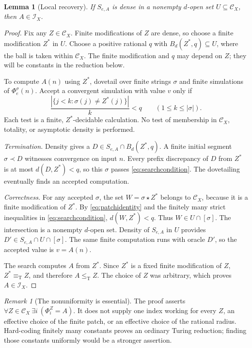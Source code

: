 \documentclass[11pt,a4paper]{article}
\newcommand{\leT}{\leq_{\mathrm T}}
\newcommand{\eqT}{\equiv_{\mathrm T}}
\newcommand{\CD}{\mathcal C}
\newcommand{\core}{\mathcal I}
\newcommand{\patch}{\mathbin\star}
\newtheorem{lemma}[theorem]{Lemma}
\theoremstyle{definition}\newtheorem{definition}[theorem]{Definition}
\theoremstyle{remark}\newtheorem{remark}[theorem]{Remark}
\begin{document}
\begin{lemma}[Local recovery]\label{lem:recovery}
If $S_{e,A}$ is dense in a nonempty $d$-open set $U\subseteq\CD_X$, then
$A\in\core_X$.
\end{lemma}
\begin{proof}
Fix any $Z\in\CD_X$. Finite modifications of $Z$ are dense, so choose a finite
modification $Z^*$ in $U$. Choose a positive rational $q$ with
$B_d(Z^*,q)\subseteq U$, where the ball is taken within $\CD_X$. The finite
modification and $q$ may depend on $Z$; they will be constants in the
reduction below.

To compute $A(n)$ using $Z^*$, dovetail over finite strings $\sigma$ and
finite simulations of $\Phi_e^\sigma(n)$. Accept a convergent simulation
with value $v$ only if
\begin{equation}\label{eq:searchcondition}
 \frac{|\{j<k:\sigma(j)\ne Z^*(j)\}|}{k}<q
 \qquad(1\le k\le|\sigma|).
\end{equation}
Each test is a finite, $Z^*$-decidable calculation. No test of membership in
$\CD_X$, totality, or asymptotic density is performed.

\emph{Termination.} Density gives a $D\in S_{e,A}\cap B_d(Z^*,q)$. A finite
initial segment $\sigma\prec D$ witnesses convergence on input $n$. Every
prefix discrepancy of $D$ from $Z^*$ is at most $d(D,Z^*)<q$, so this $\sigma$
passes \eqref{eq:searchcondition}. The dovetailing eventually finds an
accepted computation.

\emph{Correctness.} For any accepted $\sigma$, the set
$W=\sigma\patch Z^*$ belongs to $\CD_X$, because it is a finite modification
of $Z^*$. By \eqref{eq:patchidentity} and the finitely many strict inequalities
in \eqref{eq:searchcondition}, $d(W,Z^*)<q$. Thus $W\in U\cap[\sigma]$.
The intersection is a nonempty $d$-open set. Density of $S_{e,A}$ in $U$
provides $D'\in S_{e,A}\cap U\cap[\sigma]$. The same finite computation runs
with oracle $D'$, so the accepted value is $v=A(n)$.

The search computes $A$ from $Z^*$. Since $Z^*$ is a fixed finite modification
of $Z$, $Z^*\eqT Z$, and therefore $A\leT Z$. The choice of $Z$ was arbitrary,
which proves $A\in\core_X$.
\end{proof}

\begin{remark}[The nonuniformity is essential]
The proof asserts $\forall Z\in\CD_X\ \exists i\ (\Phi_i^Z=A)$. It does not
supply one index working for every $Z$, an effective choice of the finite
patch, or an effective choice of the rational radius. Hard-coding finitely
many constants proves an ordinary Turing reduction; finding those constants
uniformly would be a stronger assertion.
\end{remark}
\end{document}
